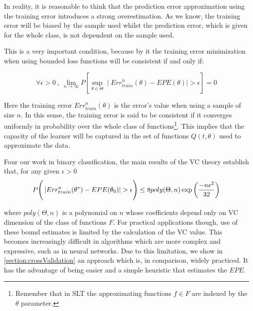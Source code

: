 \begin{appendices}
In reality, it is reasonable to think that the  prediction error approximation using the training error introduces a strong overestimation.
As we know, the training error will be biased by the sample used whilst the prediction error, which is given for the whole class, is not dependent on the sample used.

This is a very important condition, because by it the training error minimization when using bounded loss functions will be consistent if and only if:


\begin{equation}
\forall \epsilon > 0 \ , \ \lim_{n\to\infty} P\left[ \sup_{\theta \in \Theta} \mid Err^{n}_{train}(\theta) - EPE(\theta) \mid  > \epsilon  \right] = 0
\end{equation}

Here the training error $Err^{n}_{train}(\theta)$ is the error's value when using a sample of size $n$.
In this sense, the training error is said to be consistent if it converges uniformly in probability over the whole class of functions\footnote{Remember that in SLT the approximating functions $f \in F$ are indexed by the $\theta$ parameter.}.
This implies that the capacity of the learner will be captured in the set of functions $Q(t,\theta)$ used to approximate the data.


	Four our work in binary classification, the main results of the VC theory establish that, for any given $\epsilon > 0$
\begin{equation}
P\Bigg(  \left|  Err^n_{train}(\theta^*) - EPE(\theta_0) \right| > \epsilon \Bigg)  \leq 8 poly(\Theta,n) \exp{\large \left( {\frac{-n\epsilon^2}{32}} \right)  }
\end{equation}\label{eq:vapnik-binaryBoundProbability}

where $poly(\Theta,n)$ is a polynomial on $n$ whose coefficients depend only on VC dimension of the class of functions $F$.
For practical applications though, use of these bound estimates is limited by the calculation of the VC value.
This becomes increasingly difficult in algorithms which are more complex and expressive, such as in neural networks.
Due to this limitation, we show in \cref{section:crossValidation} an approach which is, in comparison, widely practiced.
It has the advantage of being easier and a simple heuristic that estimates the $EPE$.


\end{appendices}
